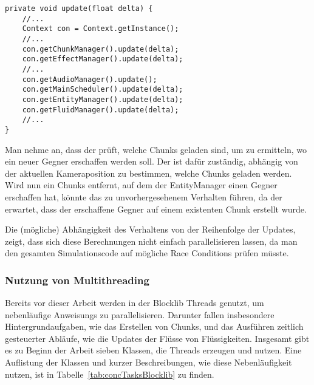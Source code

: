 \begin{lstlisting}[caption={Vereinfachte Update-Methode von \class{Game}.}, label={lst:gameUpdate},float]
private void update(float delta) {
	//...
	Context con = Context.getInstance();
	//...
	con.getChunkManager().update(delta);
	con.getEffectManager().update(delta);
	//...
	con.getAudioManager().update();
	con.getMainScheduler().update(delta);
	con.getEntityManager().update(delta);
	con.getFluidManager().update(delta);
	//...
}
\end{lstlisting}

Man nehme an, dass der  prüft, welche Chunks geladen sind, um zu ermitteln, wo ein neuer Gegner erschaffen werden soll. Der  ist dafür zuständig, abhängig von der aktuellen Kameraposition zu bestimmen, welche Chunks geladen werden. Wird nun ein Chunks entfernt, auf dem der EntityManager einen Gegner erschaffen hat, könnte das zu unvorhergesehenem Verhalten führen, da der  erwartet, dass der erschaffene Gegner auf einem existenten Chunk erstellt wurde.

Die (mögliche) Abhängigkeit des Verhaltens von der Reihenfolge der Updates, zeigt, dass sich diese Berechnungen nicht einfach parallelisieren lassen, da man den gesamten Simulationscode auf mögliche Race Conditions prüfen müsste.


\subsubsection{Nutzung von Multithreading}\label{sec:nutzungMultithreading}
Bereits vor dieser Arbeit werden in der Blocklib Threads genutzt, um nebenläufige \glspl{Anweisung} zu parallelisieren. Darunter fallen insbesondere Hintergrundaufgaben, wie das Erstellen von Chunks, und das Ausführen zeitlich gesteuerter Abläufe, wie die Updates der Flüsse von Flüssigkeiten. Insgesamt gibt es zu Beginn der Arbeit sieben Klassen, die Threads erzeugen und nutzen. Eine Auflistung der Klassen und kurzer Beschreibungen, wie diese Nebenläufigkeit nutzen, ist in Tabelle~\ref{tab:concTasksBlocklib} zu finden.

